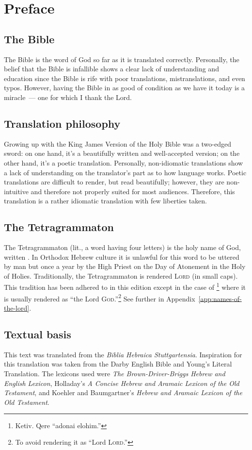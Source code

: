 \chapter*{Preface}
\section*{The Bible}
The Bible is the word of God so far as it is translated correctly. Personally, the belief that the Bible is infallible shows a clear lack of understanding and education since the Bible is rife with poor translations, mistranslations, and even typos. However, having the Bible in as good of condition as we have it today is a miracle~--- one for which I thank the Lord.

\section*{Translation philosophy}
Growing up with the King James Version of the Holy Bible was a two-edged sword: on one hand, it's a beautifully written and well-accepted version; on the other hand, it's a poetic translation. Personally, non-idiomatic translations show a lack of understanding on the translator's part as to how language works. Poetic translations are difficult to render, but read beautifully; however, they are non-intuitive and therefore not properly suited for most audiences. Therefore, this translation is a rather idiomatic translation with few liberties taken.

\section*{The Tetragrammaton}
The Tetragrammaton (lit., a word having four letters) is the holy name of God, written . In Orthodox Hebrew culture it is unlawful for this word to be uttered by man but once a year by the High Priest on the Day of Atonement in the Holy of Holies. Traditionally, the Tetragrammaton is rendered \textsc{Lord} (in small caps). This tradition has been adhered to in this edition except in the case of \footnote{Ketiv. Qere ``adonai elohim.''} where it is usually rendered as ``the Lord \textsc{God}.''\footnote{To avoid rendering it as ``Lord \textsc{Lord}.''} See further in Appendix~\ref{app:names-of-the-lord}.

\section*{Textual basis}
This text was translated from the \emph{Biblia Hebraica Stuttgartensia}. Inspiration for this translation was taken from the Darby English Bible and Young's Literal Translation. The lexicons used were \emph{The Brown-Driver-Briggs Hebrew and English Lexicon}, Holladay's \emph{A Concise Hebrew and Aramaic Lexicon of the Old Testament}, and Koehler and Baumgartner's \emph{Hebrew and Aramaic Lexicon of the Old Testament}.

